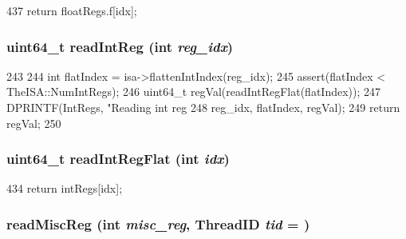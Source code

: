 \begin{DoxyCode}
437 { return floatRegs.f[idx]; }
\end{DoxyCode}
\hypertarget{classSimpleThread_a21c850cd41ab977a2cf3450fe66ec25a}{
\subsubsection[{readIntReg}]{\setlength{\rightskip}{0pt plus 5cm}uint64\_\-t readIntReg (int {\em reg\_\-idx})}}
\label{classSimpleThread_a21c850cd41ab977a2cf3450fe66ec25a}



\begin{DoxyCode}
243     {
244         int flatIndex = isa->flattenIntIndex(reg_idx);
245         assert(flatIndex < TheISA::NumIntRegs);
246         uint64_t regVal(readIntRegFlat(flatIndex));
247         DPRINTF(IntRegs, "Reading int reg %
248                 reg_idx, flatIndex, regVal);
249         return regVal;
250     }
\end{DoxyCode}
\hypertarget{classSimpleThread_aed7abd4afcb954f8612e4ef1fe73317a}{
\subsubsection[{readIntRegFlat}]{\setlength{\rightskip}{0pt plus 5cm}uint64\_\-t readIntRegFlat (int {\em idx})}}
\label{classSimpleThread_aed7abd4afcb954f8612e4ef1fe73317a}



\begin{DoxyCode}
434 { return intRegs[idx]; }
\end{DoxyCode}
\hypertarget{classSimpleThread_a71d44ee14eeab530a09bc7d68d97ece2}{
\subsubsection[{readMiscReg}]{ readMiscReg (int {\em misc\_\-reg}, \/  {\bf ThreadID} {\em tid} = {})}}
\label{classSimpleThread_a71d44ee14eeab530a09bc7d68d97ece2}



